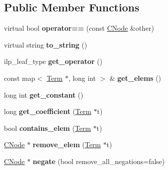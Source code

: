 \subsection*{\-Public \-Member \-Functions}
\begin{DoxyCompactItemize}
\item 
\hypertarget{classILPLeaf_a3683eed8b33a76cdd8a2a3e521029b28}{virtual bool {\bfseries operator==} (const \hyperlink{classCNode}{\-C\-Node} \&other)}\label{classILPLeaf_a3683eed8b33a76cdd8a2a3e521029b28}

\item 
\hypertarget{classILPLeaf_a888f4656b61bf03f7c2c7d3c7d45e7e2}{virtual string {\bfseries to\-\_\-string} ()}\label{classILPLeaf_a888f4656b61bf03f7c2c7d3c7d45e7e2}

\item 
\hypertarget{classILPLeaf_a0a694ab27b8c6a5a45926b97f4f60c51}{ilp\-\_\-leaf\-\_\-type {\bfseries get\-\_\-operator} ()}\label{classILPLeaf_a0a694ab27b8c6a5a45926b97f4f60c51}

\item 
\hypertarget{classILPLeaf_a601e640ff15c02f3a7c0ee5f4dc25a82}{const map$<$ \hyperlink{classTerm}{\-Term} $\ast$, long int $>$ \& {\bfseries get\-\_\-elems} ()}\label{classILPLeaf_a601e640ff15c02f3a7c0ee5f4dc25a82}

\item 
\hypertarget{classILPLeaf_a9ce63fa37098afe3d590a50d5862b8bc}{long int {\bfseries get\-\_\-constant} ()}\label{classILPLeaf_a9ce63fa37098afe3d590a50d5862b8bc}

\item 
\hypertarget{classILPLeaf_aec0b09c10a2f2e32609db6faf1e064bd}{long {\bfseries get\-\_\-coefficient} (\hyperlink{classTerm}{\-Term} $\ast$t)}\label{classILPLeaf_aec0b09c10a2f2e32609db6faf1e064bd}

\item 
\hypertarget{classILPLeaf_aaec744311d63d28f58fd130c218d828c}{bool {\bfseries contains\-\_\-elem} (\hyperlink{classTerm}{\-Term} $\ast$t)}\label{classILPLeaf_aaec744311d63d28f58fd130c218d828c}

\item 
\hypertarget{classILPLeaf_a456ddb011ba699d884e037c2054ac881}{\hyperlink{classCNode}{\-C\-Node} $\ast$ {\bfseries remove\-\_\-elem} (\hyperlink{classTerm}{\-Term} $\ast$t)}\label{classILPLeaf_a456ddb011ba699d884e037c2054ac881}

\item 
\hypertarget{classILPLeaf_abbaa583ce97c9061e3c8f2dff10884fc}{\hyperlink{classCNode}{\-C\-Node} $\ast$ {\bfseries negate} (bool remove\-\_\-all\-\_\-negations=false)}\label{classILPLeaf_abbaa583ce97c9061e3c8f2dff10884fc}


\end{DoxyCompactItemize}
